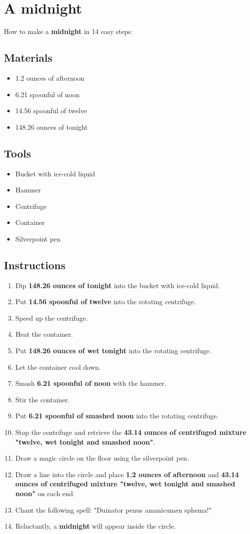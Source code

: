 \documentclass{article}
\begin{document}
\section{A midnight}How to make a \textbf{midnight} in 14 easy steps:

\subsection{Materials}\begin{itemize}
\item 
1.2 ounces of afternoon
\item 
6.21 spoonful of noon
\item 
14.56 spoonful of twelve
\item 
148.26 ounces of tonight
\end{itemize}
\subsection{Tools}\begin{itemize}
\item 
Bucket with ice-cold liquid
\item 
Hammer
\item 
Centrifuge
\item 
Container
\item 
Silverpoint pen
\end{itemize}
\subsection{Instructions}\begin{enumerate}
\item 
Dip \textbf{148.26 ounces of tonight} into the bucket with ice-cold liquid.
\item 
Put \textbf{14.56 spoonful of twelve} into the rotating centrifuge.
\item 
Speed up the centrifuge.
\item 
Heat the container.
\item 
Put \textbf{148.26 ounces of wet tonight} into the rotating centrifuge.
\item 
Let the container cool down.
\item 
Smash \textbf{6.21 spoonful of noon} with the hammer.
\item 
Stir the container.
\item 
Put \textbf{6.21 spoonful of smashed noon} into the rotating centrifuge.
\item 
Stop the centrifuge and retrieve the \textbf{43.14 ounces of centrifuged mixture "twelve, wet tonight and smashed noon"}.
\item 
Draw a magic circle on the floor using the silverpoint pen.
\item 
Draw a line into the circle and place \textbf{1.2 ounces of afternoon} and \textbf{43.14 ounces of centrifuged mixture "twelve, wet tonight and smashed noon"} on each end.
\item 
Chant the following spell: "Duinator penus amanicumen sphema!"
\item 
Reluctantly, a \textbf{midnight} will appear inside the circle.
\end{enumerate}
\newpage
\end{document}
